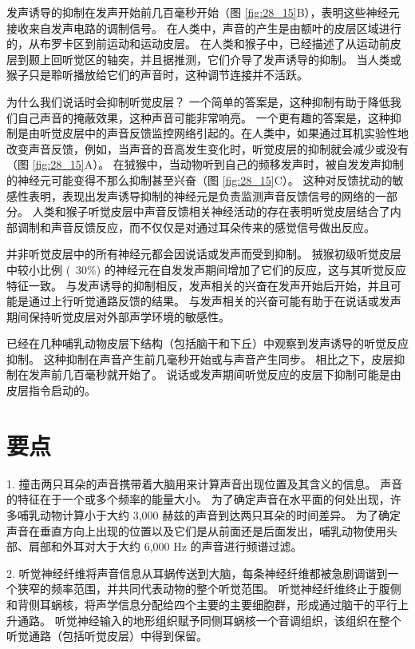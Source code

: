 发声诱导的抑制在发声开始前几百毫秒开始（图 \ref{fig:28_15}B），表明这些神经元接收来自发声电路的调制信号。
在人类中，声音的产生是由额叶的皮层区域进行的，从布罗卡区到前运动和运动皮层。 
在人类和猴子中，已经描述了从运动前皮层到颞上回听觉区的轴突，并且据推测，它们介导了发声诱导的抑制。
当人类或猴子只是聆听播放给它们的声音时，这种调节连接并不活跃。


为什么我们说话时会抑制听觉皮层？
一个简单的答案是，这种抑制有助于降低我们自己声音的掩蔽效果，这种声音可能非常响亮。
一个更有趣的答案是，这种抑制是由听觉皮层中的声音反馈监控网络引起的。在人类中，如果通过耳机实验性地改变声音反馈，例如，当声音的音高发生变化时，听觉皮层的抑制就会减少或没有（图 \ref{fig:28_15}A）。 在狨猴中，当动物听到自己的频移发声时，被自发发声抑制的神经元可能变得不那么抑制甚至兴奋（图 \ref{fig:28_15}C）。 这种对反馈扰动的敏感性表明，表现出发声诱导抑制的神经元是负责监测声音反馈信号的网络的一部分。 人类和猴子听觉皮层中声音反馈相关神经活动的存在表明听觉皮层结合了内部调制和声音反馈反应，而不仅仅是对通过耳朵传来的感觉信号做出反应。

并非听觉皮层中的所有神经元都会因说话或发声而受到抑制。 狨猴初级听觉皮层中较小比例 (~30\%) 的神经元在自发发声期间增加了它们的反应，这与其听觉反应特征一致。 与发声诱导的抑制相反，发声相关的兴奋在发声开始后开始，并且可能是通过上行听觉通路反馈的结果。 与发声相关的兴奋可能有助于在说话或发声期间保持听觉皮层对外部声学环境的敏感性。

已经在几种哺乳动物皮层下结构（包括脑干和下丘）中观察到发声诱导的听觉反应抑制。 这种抑制在声音产生前几毫秒开始或与声音产生同步。 相比之下，皮层抑制在发声前几百毫秒就开始了。 说话或发声期间听觉反应的皮层下抑制可能是由皮层指令启动的。


\section{要点}
1. 撞击两只耳朵的声音携带着大脑用来计算声音出现位置及其含义的信息。 声音的特征在于一个或多个频率的能量大小。 为了确定声音在水平面的何处出现，许多哺乳动物计算小于大约 3,000 赫兹的声音到达两只耳朵的时间差异。 为了确定声音在垂直方向上出现的位置以及它们是从前面还是后面发出，哺乳动物使用头部、肩部和外耳对大于大约 6,000 Hz 的声音进行频谱过滤。 

2. 听觉神经纤维将声音信息从耳蜗传送到大脑，每条神经纤维都被急剧调谐到一个狭窄的频率范围，并共同代表动物的整个听觉范围。 听觉神经纤维终止于腹侧和背侧耳蜗核，将声学信息分配给四个主要的主要细胞群，形成通过脑干的平行上升通路。 听觉神经输入的地形组织赋予同侧耳蜗核一个音调组织，该组织在整个听觉通路（包括听觉皮层）中得到保留。 


